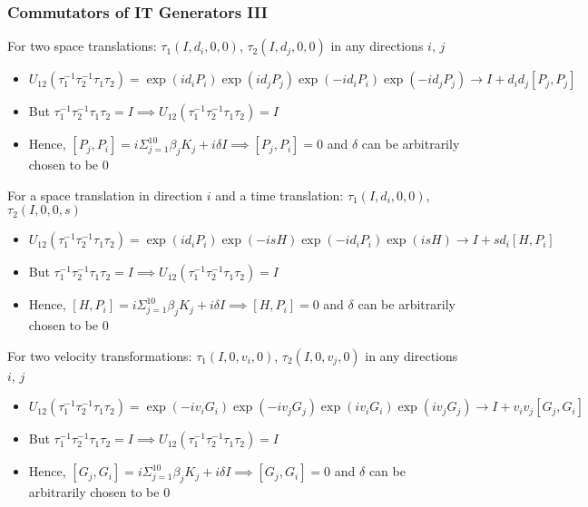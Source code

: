 \documentclass[8pt,t,mathserif,aspectratio=169]{beamer}
\begin{document}
\begin{frame}
  \frametitle{Commutators of IT Generators III}
  \vspace{1mm}
  For two space translations: $\tau_1(I,d_i,0,0)$, $\tau_2(I,d_j,0,0)$ in any directions $i$, $j$
  \begin{itemize}
    \item $U_{12}(\tau^{-1}_1 \tau^{-1}_2 \tau_1 \tau_2) = \exp(i d_i P_i) \exp(i d_j P_j) \exp(-i d_i P_i) \exp(-i d_j P_j) \to I + d_i d_j [P_j,P_j]$
    \item But $\tau^{-1}_1 \tau^{-1}_2 \tau_1 \tau_2 = I \implies U_{12}(\tau^{-1}_1 \tau^{-1}_2 \tau_1 \tau_2) = I$
    \item Hence, $[P_j,P_i] = i \Sigma_{j = 1}^{10} \beta_j K_j + i \delta I \implies [P_j,P_i] = 0$ and $\delta$ can be arbitrarily chosen to be $0$
  \end{itemize}
  For a space translation in direction $i$ and a time translation: $\tau_1(I,d_i,0,0)$, $\tau_2(I,0,0,s)$
  \begin{itemize}
    \item $U_{12}(\tau^{-1}_1 \tau^{-1}_2 \tau_1 \tau_2) = \exp(i d_i P_i) \exp(-i s H) \exp(-i d_i P_i) \exp(i s H) \to I + s d_i [H,P_i]$
    \item But $\tau^{-1}_1 \tau^{-1}_2 \tau_1 \tau_2 = I \implies U_{12}(\tau^{-1}_1 \tau^{-1}_2 \tau_1 \tau_2) = I$
    \item Hence, $[H,P_i] = i \Sigma_{j = 1}^{10} \beta_j K_j + i \delta I \implies [H,P_i] = 0$ and $\delta$ can be arbitrarily chosen to be $0$
  \end{itemize}
  For two velocity transformations: $\tau_1(I,0,v_i,0)$, $\tau_2(I,0,v_j,0)$ in any directions $i$, $j$
  \begin{itemize}
    \item $U_{12}(\tau^{-1}_1 \tau^{-1}_2 \tau_1 \tau_2) = \exp(-i v_i G_i) \exp(-i v_j G_j) \exp(i v_i G_i) \exp(i v_j G_j) \to I + v_i v_j [G_j,G_i]$
    \item But $\tau^{-1}_1 \tau^{-1}_2 \tau_1 \tau_2 = I \implies U_{12}(\tau^{-1}_1 \tau^{-1}_2 \tau_1 \tau_2) = I$
    \item Hence, $[G_j,G_i] = i \Sigma_{j = 1}^{10} \beta_j K_j + i \delta I \implies [G_j,G_i] = 0$ and $\delta$ can be arbitrarily chosen to be $0$
  \end{itemize}
\end{frame}
\end{document}
